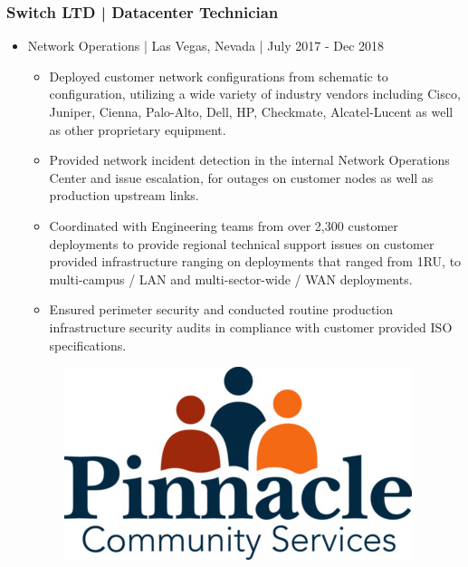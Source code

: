\documentclass[letter,10pt]{article}
\begin{document}
\subsubsection*{Switch LTD | Datacenter Technician}
\label{sec:orgf46a41a}
\begin{itemize}
\item Network Operations | Las Vegas, Nevada | July 2017 - Dec 2018
\label{sec:org918200c}
\begin{itemize}
\item Deployed customer network configurations from schematic to configuration, utilizing a wide variety of industry vendors including Cisco, Juniper, Cienna, Palo-Alto, Dell, HP, Checkmate, Alcatel-Lucent as well as other proprietary equipment.
\item Provided network incident detection in the internal Network Operations Center and issue escalation, for outages on customer nodes as well as production upstream links.
\item Coordinated with Engineering teams from over 2,300 customer deployments to provide regional technical support issues on customer provided infrastructure ranging on deployments that ranged from 1RU, to multi-campus / LAN and multi-sector-wide / WAN deployments.
\item Ensured perimeter security and conducted routine production infrastructure security audits in compliance with customer provided ISO specifications.
\end{itemize}




\begin{figure}
\includegraphics[width=0.8\linewidth]{./img/50p_cr_pinnacle.jpg}
\end{figure}
\end{itemize}
\end{document}
